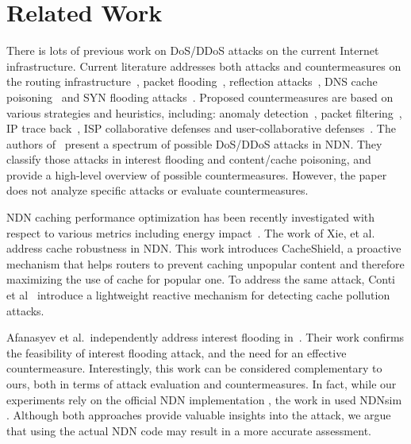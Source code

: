 \documentclass[10pt,conference,letterpaper]{IEEEtran}
\begin{document}
\section{Related Work}
\label{relatedwork}



There is lots of previous work on DoS/DDoS attacks on the current Internet  
infrastructure. Current literature addresses both attacks
and countermeasures on the routing infrastructure~\cite{routing-dos},
packet flooding~\cite{packet-flooding}, reflection
attacks~\cite{reflection-attacks}, DNS cache
poisoning~\cite{And05perilsof} and SYN flooding
attacks~\cite{Wang02detectingsyn}. Proposed 
countermeasures are based on various
strategies and heuristics, including: anomaly
detection~\cite{Carl:2006:DAT:1110639.1110699},  
packet 
filtering~\cite{Tupakula:2003:PMC:783106.783137}, IP trace
back~\cite{Lu:2008:GMP:1368310.1368337,Stone:2000:CIO:1251306.1251321},
ISP collaborative defenses \cite{DBLP:journals/tpds/ChenHK07} and user-collaborative defenses~\cite{GkantsidisR06}.
The authors of~\cite{ndn-dos} present a spectrum of possible DoS/DDoS attacks in NDN. They classify those attacks in interest flooding and content/cache poisoning, and provide a high-level overview of possible countermeasures. However, the paper does not analyze specific attacks or evaluate countermeasures. 

NDN caching performance optimization has been recently investigated 
with respect  to various metrics including energy
impact~\cite{VanSmBriPlStThBra09-Voice,approximate,greening}.
The work of Xie, et
al.~\cite{enhancing-cache-robustness}
address cache
robustness in NDN. This work introduces CacheShield, a proactive
mechanism that helps routers to prevent caching unpopular content and
therefore maximizing the use of cache for popular one.
To address the same attack, Conti et al~\cite{ContiGT13} introduce a lightweight reactive mechanism 
for detecting cache pollution attacks. 

Afanasyev et al.~independently address interest flooding in~\cite{ErsinIFIPNetworking}.
Their work confirms the feasibility of interest flooding attack, and the need for an effective 
countermeasure. Interestingly, this work can be considered complementary to ours, both in terms of 
attack evaluation and countermeasures. In fact, while our experiments rely on the official NDN 
implementation \cite{CCNx}, the work in \cite{ErsinIFIPNetworking} used NDNsim \cite{uclasim}.
Although both approaches provide valuable insights into the attack, we argue that using the actual 
NDN code may result in a more accurate assessment.
\end{document}
